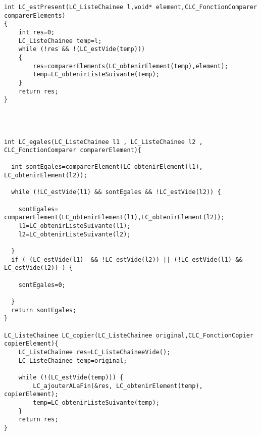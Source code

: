 \begin{verbatim}
int LC_estPresent(LC_ListeChainee l,void* element,CLC_FonctionComparer comparerElements)
{
	int res=0;
	LC_ListeChainee temp=l;
	while (!res && !(LC_estVide(temp)))
	{
		res=comparerElements(LC_obtenirElement(temp),element);
		temp=LC_obtenirListeSuivante(temp);
	}	
	return res;
}




int LC_egales(LC_ListeChainee l1 , LC_ListeChainee l2 , CLC_FonctionComparer comparerElement){
	
  int sontEgales=comparerElement(LC_obtenirElement(l1), LC_obtenirElement(l2));
	
  while (!LC_estVide(l1) && sontEgales && !LC_estVide(l2)) {
		
    sontEgales= comparerElement(LC_obtenirElement(l1),LC_obtenirElement(l2));
    l1=LC_obtenirListeSuivante(l1);
    l2=LC_obtenirListeSuivante(l2);
		
  }
  if ( (LC_estVide(l1)  && !LC_estVide(l2)) || (!LC_estVide(l1) && LC_estVide(l2)) ) {
		
    sontEgales=0;
	
  }
  return sontEgales;
}

LC_ListeChainee LC_copier(LC_ListeChainee original,CLC_FonctionCopier copierElement){
	LC_ListeChainee res=LC_ListeChaineeVide();
	LC_ListeChainee temp=original;
	
	while (!(LC_estVide(temp))) {
		LC_ajouterALaFin(&res, LC_obtenirElement(temp), copierElement);
		temp=LC_obtenirListeSuivante(temp);
	}
	return res;
}

\end{verbatim}
 
